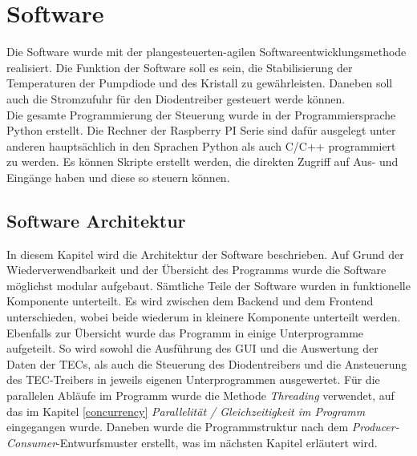 \section{Software}
Die Software wurde mit der plangesteuerten-agilen Softwareentwicklungsmethode realisiert. 
Die Funktion der Software soll es sein, die Stabilisierung der Temperaturen der Pumpdiode und des Kristall zu gewährleisten. Daneben soll auch die Stromzufuhr für den Diodentreiber gesteuert werde können.\\
Die gesamte Programmierung der Steuerung wurde in der Programmiersprache Python erstellt. Die Rechner der Raspberry PI Serie sind dafür ausgelegt unter anderen hauptsächlich in den Sprachen Python als auch C/C++ programmiert zu werden. Es können Skripte erstellt werden, die direkten Zugriff auf Aus- und Eingänge haben und diese so steuern können.\\


\subsection{Software Architektur}
\label{lab_software_architecture}
In diesem Kapitel wird die Architektur der Software beschrieben. Auf Grund der Wiederverwendbarkeit und der Übersicht des Programms wurde die Software möglichst modular aufgebaut. Sämtliche Teile der Software wurden in funktionelle Komponente unterteilt. Es wird zwischen dem Backend und dem Frontend unterschieden, wobei beide wiederum in kleinere Komponente unterteilt werden. Ebenfalls zur Übersicht wurde das Programm in einige Unterprogramme aufgeteilt. So wird sowohl die Ausführung des GUI und die Auswertung der Daten der TECs, als auch die Steuerung des Diodentreibers und die Ansteuerung des TEC-Treibers in jeweils eigenen Unterprogrammen ausgewertet. Für die parallelen Abläufe im Programm wurde die Methode \textit{Threading} verwendet, auf das im Kapitel \ref{concurrency} \textit{Parallelität / Gleichzeitigkeit im Programm} eingegangen wurde. Daneben wurde die Programmstruktur nach dem \textit{Producer-Consumer}-Entwurfsmuster erstellt, was im nächsten Kapitel erläutert wird.

